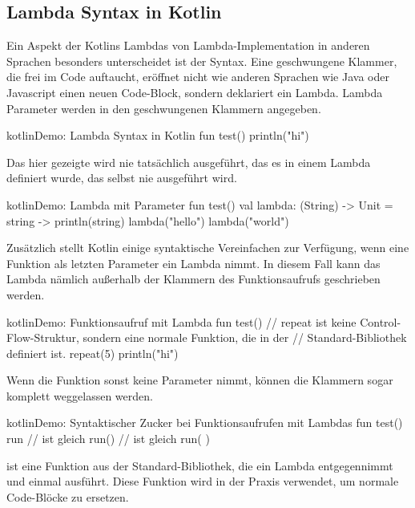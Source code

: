 \subsection{Lambda Syntax in Kotlin}
Ein Aspekt der Kotlins Lambdas von Lambda-Implementation in anderen Sprachen besonders unterscheidet ist der Syntax.
Eine geschwungene Klammer, die frei im Code auftaucht, eröffnet nicht wie anderen Sprachen wie \zB Java oder Javascript
einen neuen Code-Block, sondern deklariert ein Lambda.
Lambda Parameter werden in den geschwungenen Klammern angegeben.

\begin{codeBlock}{kotlin}{Demo: Lambda Syntax in Kotlin}
fun test() {
    {
        println("hi")
    }
}
\end{codeBlock}

Das hier gezeigte  wird nie tatsächlich ausgeführt, das es in einem Lambda
definiert wurde, das selbst nie ausgeführt wird.

\begin{codeBlock}{kotlin}{Demo: Lambda mit Parameter}
fun test() {
    val lambda: (String) -> Unit = { string -> println(string) }
    lambda("hello")
    lambda("world")
}
\end{codeBlock}

Zusätzlich stellt Kotlin einige syntaktische Vereinfachen zur Verfügung, wenn eine Funktion als letzten Parameter
ein Lambda nimmt.
In diesem Fall kann das Lambda nämlich außerhalb der Klammern des Funktionsaufrufs geschrieben werden.

\begin{codeBlock}{kotlin}{Demo: Funktionsaufruf mit Lambda}
fun test() {
    // repeat ist keine Control-Flow-Struktur, sondern eine normale Funktion, die in der
    // Standard-Bibliothek definiert ist.
    repeat(5) {
        println("hi")
    }
}
\end{codeBlock}

Wenn die Funktion sonst keine Parameter nimmt, können die Klammern sogar komplett weggelassen werden.

\begin{codeBlock}{kotlin}{Demo: Syntaktischer Zucker bei Funktionsaufrufen mit Lambdas}
fun test() {
    run {
    }
    // ist gleich
    run() {
    }
    // ist gleich
    run({ })
}
\end{codeBlock}

 ist eine Funktion aus der Standard-Bibliothek, die ein Lambda entgegennimmt und einmal ausführt.
Diese Funktion wird in der Praxis verwendet, um normale Code-Blöcke zu ersetzen.

